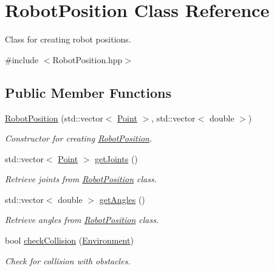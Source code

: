 \hypertarget{classRobotPosition}{}\section{Robot\+Position Class Reference}
\label{classRobotPosition}


Class for creating robot positions.  




{\ttfamily \#include $<$Robot\+Position.\+hpp$>$}

\subsection*{Public Member Functions}
\begin{DoxyCompactItemize}
\item 
\hyperlink{classRobotPosition_ae2b70e932e262489bb09f6fef05ce3a7}{Robot\+Position} (std\+::vector$<$ \hyperlink{classPoint}{Point} $>$, std\+::vector$<$ double $>$)
\begin{DoxyCompactList}\small\item\em Constructor for creating \hyperlink{classRobotPosition}{Robot\+Position}. \end{DoxyCompactList}\item 
std\+::vector$<$ \hyperlink{classPoint}{Point} $>$ \hyperlink{classRobotPosition_a3a9c92d5c2f2cd279d58b071389f362d}{get\+Joints} ()
\begin{DoxyCompactList}\small\item\em Retrieve joints from \hyperlink{classRobotPosition}{Robot\+Position} class. \end{DoxyCompactList}\item 
std\+::vector$<$ double $>$ \hyperlink{classRobotPosition_aaff4025c0db233f1cdf5fd649e377ce0}{get\+Angles} ()
\begin{DoxyCompactList}\small\item\em Retrieve angles from \hyperlink{classRobotPosition}{Robot\+Position} class. \end{DoxyCompactList}\item 
bool \hyperlink{classRobotPosition_a7808d09b49b887e5dd4fda96bffe9675}{check\+Collision} (\hyperlink{classEnvironment}{Environment})
\begin{DoxyCompactList}\small\item\em Check for collision with obstacles. \end{DoxyCompactList}\end{DoxyCompactItemize}



